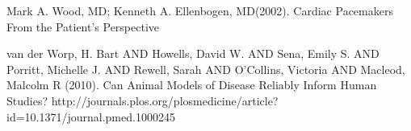 \documentclass[12pt]{article} %
\begin{document}
\begin{thebibliography}{99}
\begin{small}
\newblock Mark A. Wood, MD; Kenneth A. Ellenbogen, MD(2002).
\newline Cardiac Pacemakers From the Patient’s Perspective

\newblock van der Worp, H. Bart AND Howells, David W. AND Sena, Emily S. AND Porritt, Michelle J. AND Rewell, Sarah AND O'Collins, Victoria AND Macleod, Malcolm R
(2010). 
\newline Can Animal Models of Disease Reliably Inform Human Studies?
\newblock http://journals.plos.org/plosmedicine/article?id=10.1371/journal.pmed.1000245


\end{small}
\end{thebibliography}

\end{document}
